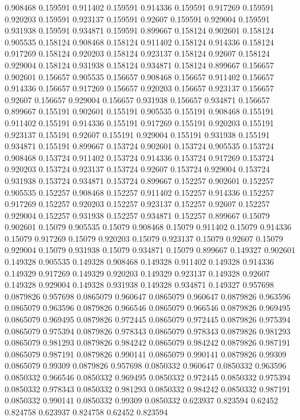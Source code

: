0.908468 0.159591
0.911402 0.159591
0.914336 0.159591
0.917269 0.159591
0.920203 0.159591
0.923137 0.159591
0.92607 0.159591
0.929004 0.159591
0.931938 0.159591
0.934871 0.159591
0.899667 0.158124
0.902601 0.158124
0.905535 0.158124
0.908468 0.158124
0.911402 0.158124
0.914336 0.158124
0.917269 0.158124
0.920203 0.158124
0.923137 0.158124
0.92607 0.158124
0.929004 0.158124
0.931938 0.158124
0.934871 0.158124
0.899667 0.156657
0.902601 0.156657
0.905535 0.156657
0.908468 0.156657
0.911402 0.156657
0.914336 0.156657
0.917269 0.156657
0.920203 0.156657
0.923137 0.156657
0.92607 0.156657
0.929004 0.156657
0.931938 0.156657
0.934871 0.156657
0.899667 0.155191
0.902601 0.155191
0.905535 0.155191
0.908468 0.155191
0.911402 0.155191
0.914336 0.155191
0.917269 0.155191
0.920203 0.155191
0.923137 0.155191
0.92607 0.155191
0.929004 0.155191
0.931938 0.155191
0.934871 0.155191
0.899667 0.153724
0.902601 0.153724
0.905535 0.153724
0.908468 0.153724
0.911402 0.153724
0.914336 0.153724
0.917269 0.153724
0.920203 0.153724
0.923137 0.153724
0.92607 0.153724
0.929004 0.153724
0.931938 0.153724
0.934871 0.153724
0.899667 0.152257
0.902601 0.152257
0.905535 0.152257
0.908468 0.152257
0.911402 0.152257
0.914336 0.152257
0.917269 0.152257
0.920203 0.152257
0.923137 0.152257
0.92607 0.152257
0.929004 0.152257
0.931938 0.152257
0.934871 0.152257
0.899667 0.15079
0.902601 0.15079
0.905535 0.15079
0.908468 0.15079
0.911402 0.15079
0.914336 0.15079
0.917269 0.15079
0.920203 0.15079
0.923137 0.15079
0.92607 0.15079
0.929004 0.15079
0.931938 0.15079
0.934871 0.15079
0.899667 0.149327
0.902601 0.149328
0.905535 0.149328
0.908468 0.149328
0.911402 0.149328
0.914336 0.149329
0.917269 0.149329
0.920203 0.149329
0.923137 0.149328
0.92607 0.149328
0.929004 0.149328
0.931938 0.149328
0.934871 0.149327
0.957698 0.0879826
0.957698 0.0865079
0.960647 0.0865079
0.960647 0.0879826
0.963596 0.0865079
0.963596 0.0879826
0.966546 0.0865079
0.966546 0.0879826
0.969495 0.0865079
0.969495 0.0879826
0.972445 0.0865079
0.972445 0.0879826
0.975394 0.0865079
0.975394 0.0879826
0.978343 0.0865079
0.978343 0.0879826
0.981293 0.0865079
0.981293 0.0879826
0.984242 0.0865079
0.984242 0.0879826
0.987191 0.0865079
0.987191 0.0879826
0.990141 0.0865079
0.990141 0.0879826
0.99309 0.0865079
0.99309 0.0879826
0.957698 0.0850332
0.960647 0.0850332
0.963596 0.0850332
0.966546 0.0850332
0.969495 0.0850332
0.972445 0.0850332
0.975394 0.0850332
0.978343 0.0850332
0.981293 0.0850332
0.984242 0.0850332
0.987191 0.0850332
0.990141 0.0850332
0.99309 0.0850332
0.623937 0.823594
0.62452 0.824758
0.623937 0.824758
0.62452 0.823594
